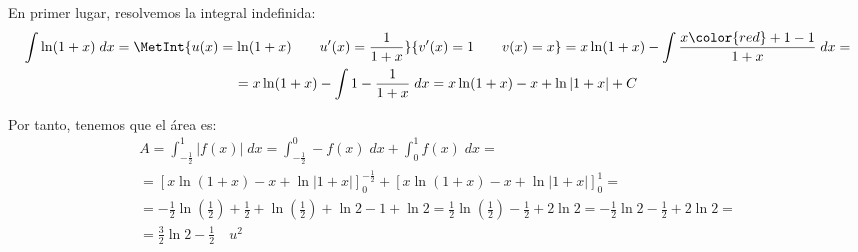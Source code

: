 \documentclass[12pt]{article}
\begin{document}
\begin{ejercicio}
\begin{enumerate}
\begin{figure}[H]
    \end{figure}

    En primer lugar, resolvemos la integral indefinida:
    \begin{multline*}
        \int \ln (1+x)\;dx = \MetInt{u(x)=\ln (1+x) \qquad u'(x)=\frac{1}{1+x}}{v'(x)=1 \qquad v(x)=x}
        = x\ln (1+x) -\int \frac{x {\color{red}+1-1}}{1+x}\;dx
        =\\= x\ln (1+x) -\int 1-\frac{1}{1+x}\;dx
        = x\ln (1+x) -x +\ln|1+x|+C
    \end{multline*}

    Por tanto, tenemos que el área es:
    \begin{multline*}
        A = \int_{-\frac{1}{2}}^1 |f(x)|\;dx
        = \int_{-\frac{1}{2}}^0 -f(x)\;dx
        + \int_{0}^1 f(x)\;dx
        =\\= \left[x\ln (1+x) -x +\ln|1+x|\right]^{-\frac{1}{2}}_0
        + \left[x\ln (1+x) -x +\ln|1+x|\right]_0^1
        =\\= -\frac{1}{2}\ln \left(\frac{1}{2}\right) +\frac{1}{2}+\ln \left(\frac{1}{2}\right) +\ln 2 -1 +\ln 2
        = \frac{1}{2}\ln \left(\frac{1}{2}\right) -\frac{1}{2}+ 2\ln 2
        = -\frac{1}{2}\ln 2 -\frac{1}{2}+ 2\ln 2
        =\\= \frac{3}{2}\ln 2 -\frac{1}{2} \quad u^2
    \end{multline*}
    
\end{enumerate}
\end{ejercicio}
\end{document}
